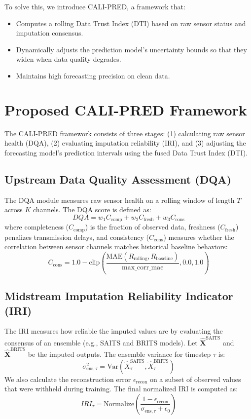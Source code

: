 \documentclass[journal]{IEEEtran}
\begin{document}
To solve this, we introduce CALI-PRED, a framework that:
\begin{itemize}
    \item Computes a rolling Data Trust Index (DTI) based on raw sensor status and imputation consensus.
    \item Dynamically adjusts the prediction model's uncertainty bounds so that they widen when data quality degrades.
    \item Maintains high forecasting precision on clean data.
\end{itemize}

\section{Proposed CALI-PRED Framework}

The CALI-PRED framework consists of three stages: (1) calculating raw sensor health (DQA), (2) evaluating imputation reliability (IRI), and (3) adjusting the forecasting model's prediction intervals using the fused Data Trust Index (DTI).

\subsection{Upstream Data Quality Assessment (DQA)}
The DQA module measures raw sensor health on a rolling window of length $T$ across $K$ channels. The DQA score is defined as:
\begin{equation}
DQA = w_1 C_{\text{comp}} + w_2 C_{\text{fresh}} + w_3 C_{\text{cons}}
\end{equation}
where completeness ($C_{\text{comp}}$) is the fraction of observed data, freshness ($C_{\text{fresh}}$) penalizes transmission delays, and consistency ($C_{\text{cons}}$) measures whether the correlation between sensor channels matches historical baseline behaviors:
\begin{equation}
C_{\text{cons}} = 1.0 - \text{clip}\left(\frac{\text{MAE}(R_{\text{rolling}}, R_{\text{baseline}})}{\text{max\_corr\_mae}}, 0.0, 1.0\right)
\end{equation}

\subsection{Midstream Imputation Reliability Indicator (IRI)}
The IRI measures how reliable the imputed values are by evaluating the consensus of an ensemble (e.g., SAITS and BRITS models). Let $\hat{\mathbf{X}}^{\text{SAITS}}$ and $\hat{\mathbf{X}}^{\text{BRITS}}$ be the imputed outputs. The ensemble variance for timestep $\tau$ is:
\begin{equation}
\sigma^{2}_{\text{ens}, \tau} = \text{Var}\left( \hat{X}^{\text{SAITS}}_{\tau}, \hat{X}^{\text{BRITS}}_{\tau} \right)
\end{equation}
We also calculate the reconstruction error $\epsilon_{\text{recon}}$ on a subset of observed values that were withheld during training. The final normalized IRI is computed as:
\begin{equation}
IRI_{\tau} = \text{Normalize}\left(\frac{1 - \epsilon_{\text{recon}}}{\sigma_{\text{ens}, \tau} + \epsilon_0}\right)
\end{equation}
\end{document}
